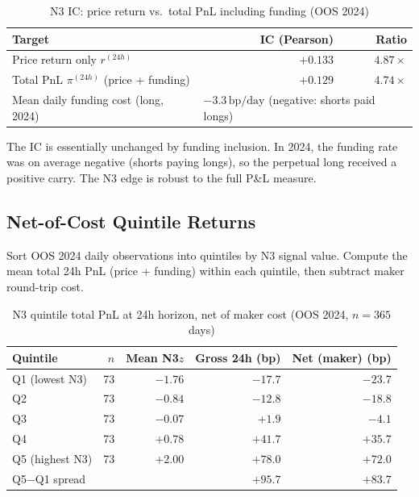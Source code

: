 \documentclass[12pt, a4paper]{article}
\theoremstyle{plain}
\theoremstyle{definition}
\newcommand{\bp}{\,\mathrm{bp}}
\begin{document}
\begin{table}[H]
\centering
\caption{N3 IC: price return vs.\ total PnL including funding (OOS 2024)}
\label{tab:funding}
\begin{tabular}{lrr}
\toprule
Target & IC (Pearson) & Ratio \\
\midrule
Price return only $r^{(24h)}$       & $+0.133$ & $4.87\times$ \\
Total PnL $\pi^{(24h)}$ (price + funding) & $+0.129$ & $4.74\times$ \\
\midrule
Mean daily funding cost (long, 2024) & \multicolumn{2}{l}{$-3.3\bp/\text{day}$ (negative: shorts paid longs)} \\
\bottomrule
\end{tabular}
\end{table}

The IC is essentially unchanged by funding inclusion. In 2024, the funding
rate was on average negative (shorts paying longs), so the perpetual long
received a positive carry. The N3 edge is robust to the full P\&L measure.

\subsection{Net-of-Cost Quintile Returns}

Sort OOS 2024 daily observations into quintiles by N3 signal value.
Compute the mean total 24h PnL (price + funding) within each quintile,
then subtract maker round-trip cost.

\begin{table}[H]
\centering
\caption{N3 quintile total PnL at 24h horizon, net of maker cost
(OOS 2024, $n=365$ days)}
\label{tab:quintile}
\begin{tabular}{lrrrr}
\toprule
Quintile & $n$ & Mean N3$z$ & Gross 24h (bp) & Net (maker) (bp) \\
\midrule
Q1 (lowest N3)  & 73 & $-1.76$ & $-17.7$ & $-23.7$ \\
Q2              & 73 & $-0.84$ & $-12.8$ & $-18.8$ \\
Q3              & 73 & $-0.07$ & $+1.9$  & $-4.1$  \\
Q4              & 73 & $+0.78$ & $+41.7$ & $+35.7$ \\
Q5 (highest N3) & 73 & $+2.00$ & $+78.0$ & $+72.0$ \\
\midrule
Q5$-$Q1 spread  &    &         & $+95.7$ & $+83.7$ \\
\bottomrule
\end{tabular}
\end{table}
\end{document}
